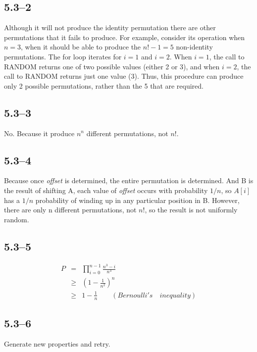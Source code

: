 \documentclass{article}
\begin{document}
\subsection*{5.3--2}
Although it will not produce the identity permutation there are other
permutations that it fails to produce. For example, consider
its operation when $n = 3$, when it should be able to produce the $n!-1 = 5$  
non-identity permutations. The for loop iterates for $i = 1$ and $i = 2$. When
$i = 1$, the call to RANDOM returns one of two possible values (either 2 or 3),
and when $i = 2$, the call to RANDOM returns just one value (3). Thus, this
procedure  can produce only 2 possible permutations, rather than the 5 that
are required.

\subsection*{5.3--3}
No. Because it produce $n^n$ different permutations, not $ n! $.

\subsection*{5.3--4}
Because once \textit{offset} is determined, the entire permutation is
determined. And B is the result of shifting A, each value of \textit{offset}
occurs with probability $1/n$, so $A[i]$ has a $1/n$ probability of winding up
in any particular position in B. However, there are only n different
permutations, not $ n! $, so the result is not uniformly random.

\subsection*{5.3--5}
\begin{eqnarray*}
  P &=& \prod_{i = 0}^{n-1}\frac{n^3-i}{n^3} \\
    &\ge& {(1 - \frac{1}{n^2})}^n \\
    &\ge& 1 - \frac{1}{n}  \qquad (Bernoulli's \quad inequality)
\end{eqnarray*}

\subsection*{5.3--6}
Generate new properties and retry.
\end{document}
